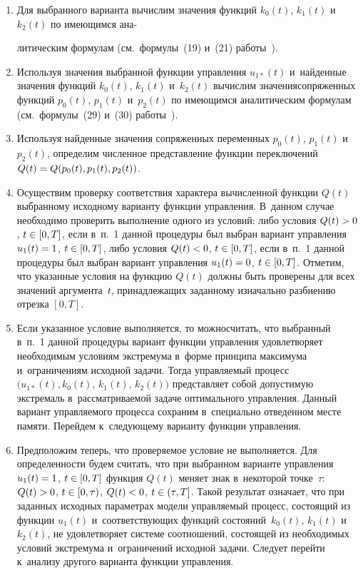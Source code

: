 \begin{multicols}{2}
\begin{enumerate}[1.]
\item Для выбранного варианта вычислим значения функций  $k_0(t)$, $k_1(t)$ и~$k_2(t)$ 
по имеющимся ана-\linebreak\vspace*{-12pt}

\pagebreak

\noindent
литическим формулам (см.\ формулы~(19) и~(21) работы~\cite{1-gor}).

\item Используя значения выбранной функции управ\-ле\-ния $u_{1*}(t)$  и~найденные 
значения функций $k_0(t)$, $k_1(t)$ и~$k_2(t)$ вычислим значения\linebreak сопряженных 
функций $p_0(t)$, $p_1(t)$ и~$p_2(t)$ по име\-ющим\-ся аналитическим формулам (см.\ 
формулы~(29) и~(30) работы~\cite{1-gor}).

\item Используя найденные  значения сопряженных переменных $p_0(t)$, $p_1(t)$
и~$p_2(t)$, определим чис\-лен\-ное представление функции переключений $Q(t)\hm=Q(p_0(t),
p_1(t),p_2(t))$.

\item Осуществим проверку соответствия характера вычисленной функции $Q(t)$ 
выбранному исходному варианту функции управления. В~данном случае необходимо проверить 
выполнение одного из условий: либо условия $Q(t)\hm>0$, $t \hm\in [0,T]$, если в~п.~1 
данной процедуры был выбран вариант управления $u_{1}(t)\hm=1$, $t \hm\in [0,T]$, 
либо условия $Q(t)\hm<0$, $t \hm\in [0,T]$, если в~п.~1 данной процедуры был 
выбран вариант управ\-ле\-ния $u_{1}(t)\hm=0$, $t \hm\in [0,T]$. Отметим, что 
указанные условия на функцию $Q(t)$ должны быть проверены для всех значений 
аргумента~$t$, принадлежащих заданному изначально разбиению отрезка $[0,T]$.

\item Если указанное условие выполняется, то можно\linebreak считать, что выбранный в~п.~1 
данной проце\-дуры вариант функции управления удовле\-творяет необходимым условиям 
экстремума  в~форме принципа максимума и~ограничениям исходной задачи. 
Тогда управляемый процесс $(u_{1*}(t), k_0(t)$, $k_1(t)$, $k_2(t))$ 
представляет собой допустимую экстремаль в~рассматриваемой задаче оптимального 
управления. Данный вариант управляемого процесса сохраним в~специально отведенном 
месте памяти. Перейдем к~следующему варианту функции управления.

\item Предположим теперь, что проверяемое условие не выполняется. Для определенности 
будем считать, что при выбранном варианте управления $u_{1}(t)\hm=1$,  $t \hm\in [0,T]$ 
функция $Q(t)$ меняет знак в~некоторой точке~$\tau$: $Q(t)\hm>0$, $t \hm\in [0,\tau)$, 
$Q(t)\hm<0$, $t \hm\in (\tau,T]$.
Такой результат означает, что при заданных исходных параметрах модели управляемый 
процесс, состоящий из функции $u_{1}(t)$ и~соответствующих функций 
состояний~$k_0(t)$, $k_1(t)$ и~$k_2(t)$, не удовлетворяет системе соотношений, 
состоящей из необходимых условий экстремума и~ограничений исходной задачи. 
Следует перейти к~анализу другого варианта функции управления.


\end{enumerate}
\end{multicols}
